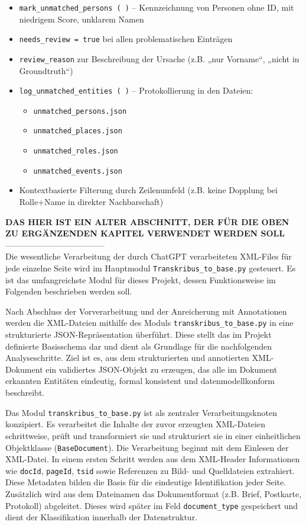 \documentclass[12pt, a4paper, ngerman, bidi=default]{article}
\newcommand{\code}[1]{\colorbox{VeryLightGray}{\texttt{#1}}} %
\begin{document}
\begin{itemize}
\item \texttt{mark\_unmatched\_persons~(~)} – Kennzeichnung von Personen ohne ID, mit niedrigem Score, unklarem Namen
\item \texttt{needs\_review = true} bei allen problematischen Einträgen
\item \texttt{review\_reason} zur Beschreibung der Ursache (z.B. „nur Vorname“, „nicht in Groundtruth“)
\item \texttt{log\_unmatched\_entities~(~)} – Protokollierung in den Dateien:
  \begin{itemize}
  \item \texttt{unmatched\_persons.json}
  \item \texttt{unmatched\_places.json}
  \item \texttt{unmatched\_roles.json}
  \item \texttt{unmatched\_events.json}
  \end{itemize}
\item Kontextbasierte Filterung durch Zeilenumfeld (z.B. keine Dopplung bei Rolle+Name in direkter Nachbarschaft)
\end{itemize}


\vspace{1em}\textbf{DAS HIER IST EIN ALTER ABSCHNITT, DER FÜR DIE OBEN ZU ERGÄNZENDEN KAPITEL VERWENDET WERDEN SOLL}\\
------------------------------------\\
Die wesentliche Verarbeitung der durch ChatGPT verarbeiteten XML-Files für jede einzelne Seite wird im 
Hauptmodul \code{Transkribus\_to\_base.py} gesteuert. Es ist das umfangreichste
Modul für dieses Projekt, dessen Funktionsweise im Folgenden beschrieben werden soll.

Nach Abschluss der Vorverarbeitung und der Anreicherung mit Annotationen werden die XML-Dateien mithilfe des 
Moduls \texttt{transkribus\_to\_base.py} in eine strukturierte JSON-Repräsentation überführt. Diese stellt das 
im Projekt definierte Basisschema dar und dient als Grundlage für die nachfolgenden Analyseschritte. Ziel ist es, 
aus dem strukturierten und annotierten XML-Dokument ein validiertes JSON-Objekt zu erzeugen, das alle im Dokument 
erkannten Entitäten eindeutig, formal konsistent und datenmodellkonform beschreibt.

Das Modul \code{transkribus\_to\_base.py} ist als zentraler Verarbeitungsknoten konzipiert. Es verarbeitet die Inhalte 
der zuvor erzeugten XML-Dateien schrittweise, prüft und transformiert sie und strukturiert sie in einer einheitlichen Objektklasse 
(\code{BaseDocument}). Die Verarbeitung beginnt mit dem Einlesen der XML-Datei. In einem ersten Schritt werden aus dem XML-Header 
Informationen wie \code{docId}, \code{pageId}, \code{tsid} sowie Referenzen zu Bild- und Quelldateien extrahiert. Diese Metadaten 
bilden die Basis für die eindeutige Identifikation jeder Seite. Zusätzlich wird aus dem Dateinamen das Dokumentformat (z.B. Brief, 
Postkarte, Protokoll) abgeleitet. Dieses wird später im Feld \code{document\_type} gespeichert und dient der Klassifikation innerhalb 
der Datenstruktur.
\end{document}
